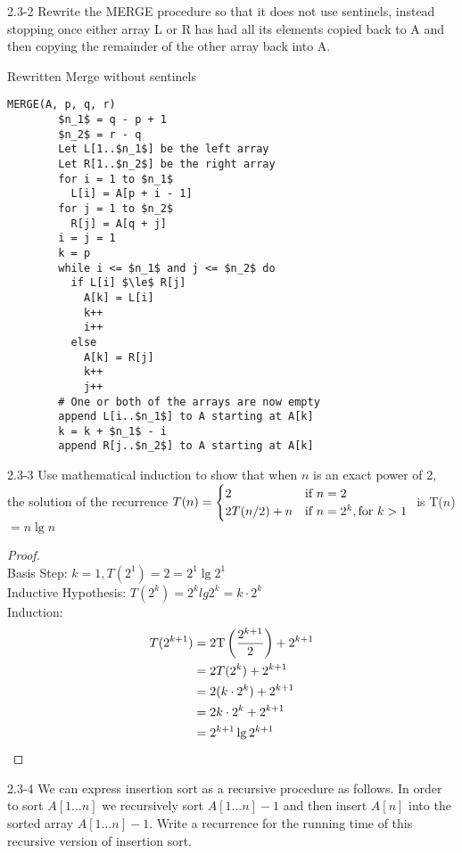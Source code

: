\begin{problem}{2.3-2}
  Rewrite the MERGE procedure so that it does not use sentinels, instead stopping once either array L or R has had all its
  elements copied back to A and then copying the remainder of the other array back into A.

  \begin{solution}
   \centerline{Rewritten Merge without sentinels}
    \begin{lstlisting}[mathescape]
      MERGE(A, p, q, r)
        $n_1$ = q - p + 1
        $n_2$ = r - q
        Let L[1..$n_1$] be the left array
        Let R[1..$n_2$] be the right array
        for i = 1 to $n_1$
          L[i] = A[p + i - 1]
        for j = 1 to $n_2$
          R[j] = A[q + j]
        i = j = 1
        k = p
        while i <= $n_1$ and j <= $n_2$ do
          if L[i] $\le$ R[j]
            A[k] = L[i]
            k++
            i++
          else
            A[k] = R[j]
            k++
            j++
        # One or both of the arrays are now empty
        append L[i..$n_1$] to A starting at A[k]
        k = k + $n_1$ - i
        append R[j..$n_2$] to A starting at A[k]
    \end{lstlisting}
  \end{solution}
\end{problem} \newpage

\begin{problem}{2.3-3}
  Use mathematical induction to show that when $n$ is an exact power of 2, the solution of the recurrence
  $T(n) = \begin{cases}
    2 & \text{if } n = 2 \\
    2T(n/2) + n & \text{if } n = 2^k, \text{for } k >1
  \end{cases} \\
  $ is T($n$)$=n \lg n$
  \begin{proof}\ \\
    Basis Step: $k = 1, T(2^1) = 2 = 2^1 \lg 2^1$ \\
    Inductive Hypothesis: $T(2^k) = 2^k lg 2^k = k \cdot 2^k$ \\
    Induction: \begin{align*}
      T(2^{k+1}) &= 2\text{T}\left(\frac{2^{k+1}}{2}\right) + 2^{k+1} \\
      &= 2T(2^k) + 2^{k+1} \\
      &= 2(k \cdot 2^k) + 2^{k+1} \\
      &= 2k \cdot 2^k + 2^{k+1} \\
      &= 2^{k + 1} \lg 2^{k+1} \qedhere
    \end{align*}

  \end{proof}
\end{problem}

\begin{problem}{2.3-4}
  We can express insertion sort as a recursive procedure as follows. In order to sort $A[1\ldots n]$ we recursively sort
  $A[1\ldots n] - 1 $ and then insert $A[n]$ into the sorted array $A[1\ldots n] - 1 $.
  Write a recurrence for the running time of this recursive version of insertion sort.
\end{problem}


